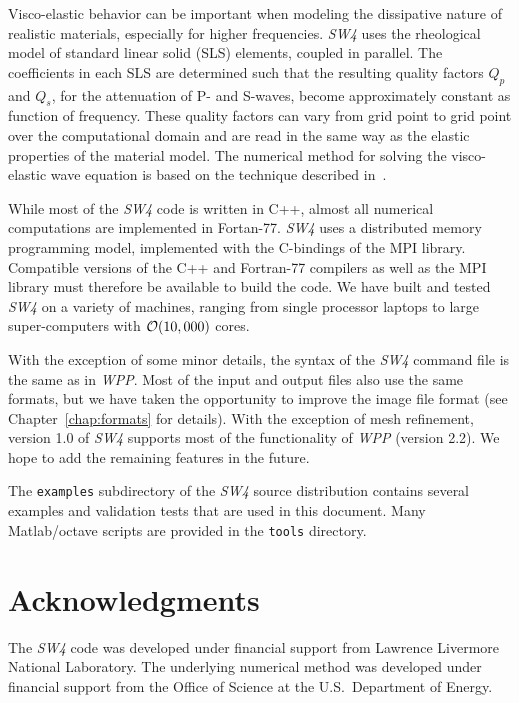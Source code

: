 \documentclass[11pt]{report}
\begin{document}
Visco-elastic behavior can be important when modeling the dissipative nature of realistic materials,
especially for higher frequencies. \emph{SW4} uses the rheological model of standard linear solid
(SLS) elements, coupled in parallel. The coefficients in each SLS are determined such that the
resulting quality factors $Q_p$ and $Q_s$, for the attenuation of P- and S-waves, become
approximately constant as function of frequency. These quality factors can vary from grid point to
grid point over the computational domain and are read in the same way as the elastic properties of
the material model. The numerical method for solving the visco-elastic wave equation is
based on the technique described in~\cite{PetSjo-10b}.

While most of the \emph{SW4} code is written in C++, almost all numerical computations are
implemented in Fortan-77. \emph{SW4} uses a distributed memory programming model, implemented with
the C-bindings of the MPI library. Compatible versions of the C++ and Fortran-77 compilers as well
as the MPI library must therefore be available to build the code. We have built and tested
\emph{SW4} on a variety of machines, ranging from single processor laptops to large super-computers
with ${\cal O}(10,000)$ cores.

With the exception of some minor details, the syntax of the \emph{SW4} command file is the same as
in \emph{WPP}. Most of the input and output files also use the same formats, but we have taken the
opportunity to improve the image file format (see Chapter~\ref{chap:formats} for details). With the
exception of mesh refinement, version 1.0 of \emph{SW4} supports most of the functionality of
\emph{WPP} (version 2.2). We hope to add the remaining features in the future.

The {\tt examples} subdirectory of the \emph{SW4} source distribution contains several examples and
validation tests that are used in this document. Many Matlab/octave scripts are provided in the
{\tt tools} directory.

\section*{Acknowledgments} 
The \emph{SW4} code was developed under financial support from Lawrence Livermore National
Laboratory. The underlying numerical method was developed under financial support from
the Office of Science at the U.S.~Department of Energy.


\end{document}
